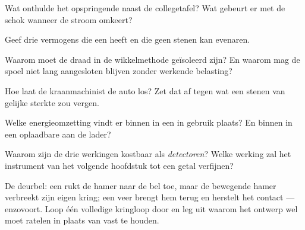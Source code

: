 \begin{exercise}[$\star$]\label{exo:g8:electric-current-effects:3}
Wat onthulde het opspringende  naast de collegetafel? Wat
gebeurt er met de schok wanneer de stroom omkeert?
\end{exercise}

\begin{exercise}[$\star$]\label{exo:g8:electric-current-effects:4}
Geef drie vermogens die een  heeft en die geen
stenen  kan evenaren.
\end{exercise}

\begin{exercise}[$\star$]\label{exo:g8:electric-current-effects:5}
Waarom moet de draad in de wikkelmethode geïsoleerd zijn? En waarom
mag de spoel niet lang aangesloten blijven zonder werkende belasting?
\end{exercise}

\begin{exercise}[$\star$]\label{exo:g8:electric-current-effects:6}
Hoe laat de kraanmachinist de auto los? Zet dat af tegen wat een
stenen  van gelijke sterkte zou vergen.
\end{exercise}

\begin{exercise}[$\star$]\label{exo:g8:electric-current-effects:7}
Welke energieomzetting vindt er binnen in een
 in gebruik plaats? En binnen in een oplaadbare
 aan de lader?
\end{exercise}

\begin{exercise}[$\star$]\label{exo:g8:electric-current-effects:8}
Waarom zijn de drie werkingen kostbaar als \emph{detectoren}? Welke
werking zal het instrument van het volgende hoofdstuk tot een getal
verfijnen?
\end{exercise}

\begin{exercise}[$\star\star$]\label{exo:g8:electric-current-effects:9}
De deurbel: een  rukt de hamer naar de bel toe,
maar de bewegende hamer verbreekt zijn eigen kring; een veer brengt
hem terug en herstelt het contact --- enzovoort. Loop één volledige
kringloop door en leg uit waarom het ontwerp wel moet ratelen in
plaats van vast te houden.
\end{exercise}

